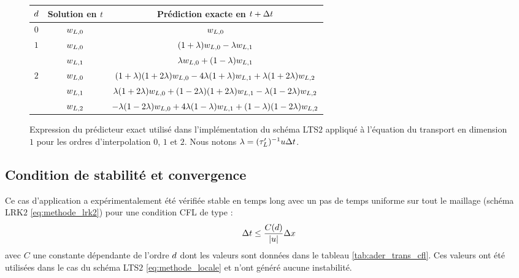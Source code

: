 \begin{figure}[!h]
	\begin{center}
		\caption{
			\label{tab:exact_predictor}
			Expression du prédicteur exact utilisé dans l'implémentation
			du schéma LTS$2$ appliqué à l'équation
			du transport en dimension $1$ pour les ordres d'interpolation
			$0$, $1$ et $2$.
			Nous notons $\lambda = (\tau_{L}')^{-1} u \Delta t$.
		}
		
		\begin{tabular}{|c|c|c|}
			\hline
			$d$ & Solution en $t$ & Prédiction exacte en $t + \Delta t$ \\
			\hline\hline
			$0$ & $w_{L,0}$ & $w_{L,0}$ \\
			\hline
			\multirow{2}{*}{$1$}
			& $w_{L,0}$ & $(1 + \lambda) w_{L,0} - \lambda w_{L,1}$ \\
			& $w_{L,1}$ & $\lambda w_{L,0} + (1 - \lambda) w_{L,1}$ \\
			\hline
			\multirow{3}{*}{$2$}
			& $w_{L,0}$ & $(1 + \lambda) (1 + 2 \lambda) w_{L,0} - 4 \lambda (1 + \lambda) w_{L,1} + \lambda (1 + 2 \lambda) w_{L,2}$ \\
			& $w_{L,1}$ & $\lambda (1 + 2 \lambda) w_{L,0} + (1 - 2 \lambda) (1 + 2 \lambda) w_{L,1} - \lambda (1 - 2 \lambda) w_{L,2}$ \\
			& $w_{L,2}$ & $- \lambda (1 - 2 \lambda) w_{L,0} + 4 \lambda (1 - \lambda) w_{L,1} + (1 - \lambda) (1 - 2 \lambda) w_{L,2}$ \\
			\hline
		\end{tabular}
	\end{center}
\end{figure}


\subsection{Condition de stabilité et convergence}
\label{ssect:lts2 transport stabilite}

Ce cas d'application a expérimentalement été vérifiée stable en temps long
avec un pas de temps uniforme sur tout le maillage 
(schéma LRK$2$ \eqref{eq:methode_lrk2})
pour une condition CFL de type :
\begin{align}
	\Delta t \le \frac{C(d)}{\left\vert u\right\vert} \Delta x
	\label{eq:ader_cfl}
\end{align}
avec $C$ une constante dépendante de l'ordre $d$ dont les valeurs
sont données dans le tableau \ref{tab:ader_trans_cfl}.
Ces valeurs ont été utilisées dans le cas
du schéma LTS$2$ \eqref{eq:methode_locale}
et n'ont généré aucune instabilité.

